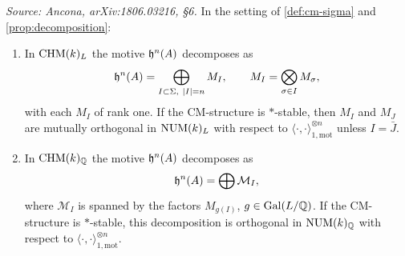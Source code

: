 \begin{proposition}[CM decomposition of \(\hh^n\)]
  \label{prop:cm-decomposition}
  \textit{Source: Ancona, arXiv:1806.03216, §6.}
  In the setting of \cref{def:cm-sigma} and \cref{prop:decomposition}:
  \begin{enumerate}
    \item In \(\mathrm{CHM}(k)_{L}\) the motive \(\mathfrak{h}^n(A)\) decomposes as
      \[\mathfrak{h}^n(A) = \bigoplus_{I \subset \Sigma,\ |I| = n} M_I, \qquad
        M_I = \bigotimes_{\sigma \in I} M_\sigma,\]
      with each \(M_I\) of rank one. If the CM-structure is \(*\)-stable, then
      \(M_I\) and \(M_J\) are mutually orthogonal in \(\mathrm{NUM}(k)_L\) with respect
      to \(\langle \cdot, \cdot \rangle_{1,\mathrm{mot}}^{\otimes n}\) unless
      \(I = \bar J\).
    \item In \(\mathrm{CHM}(k)_{\mathbb{Q}}\) the motive \(\mathfrak{h}^n(A)\) decomposes as
      \[\mathfrak{h}^n(A) = \bigoplus \mathcal{M}_I,\]
      where \(\mathcal{M}_I\) is spanned by the factors \(M_{g(I)}\),
      \(g \in \mathrm{Gal}(L/\mathbb{Q})\). If the CM-structure is \(*\)-stable, this
      decomposition is orthogonal in \(\mathrm{NUM}(k)_{\mathbb{Q}}\) with respect to
      \(\langle \cdot, \cdot \rangle_{1,\mathrm{mot}}^{\otimes n}\).
  \end{enumerate}
\end{proposition}

